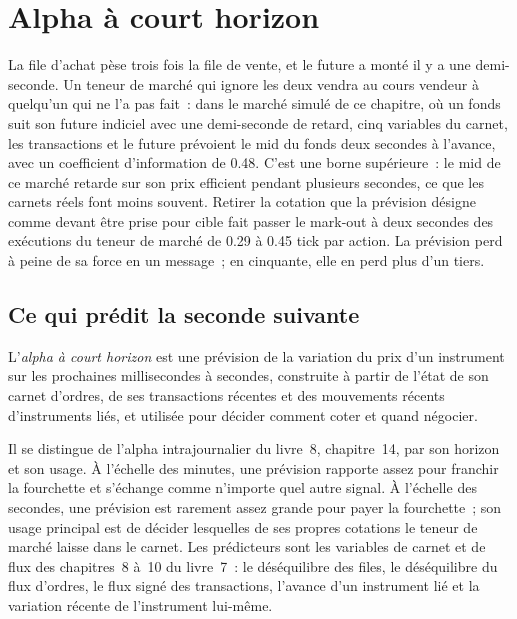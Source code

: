 \chapter{Alpha à court horizon}\label{ch:hf:short-horizon-alpha}

La file d'achat pèse trois fois la file de vente, et le future a monté il y a une demi-seconde. Un teneur de marché qui ignore les deux vendra au cours vendeur
à quelqu'un qui ne l'a pas fait~: dans le marché simulé de ce chapitre, où un fonds suit son future indiciel avec une demi-seconde de retard, cinq variables du carnet, les
transactions et le future prévoient le mid du fonds deux secondes à l'avance, avec un coefficient d'information de 0.48. C'est une borne supérieure~: le mid de ce
marché retarde sur son prix efficient pendant plusieurs secondes, ce que les carnets réels font moins souvent. Retirer la cotation que la prévision désigne
comme devant être prise pour cible fait passer le mark-out à deux secondes des exécutions du teneur de marché de 0.29 à 0.45 tick par action. La prévision perd à peine
de sa force en un message~; en cinquante, elle en perd plus d'un tiers.

\section{Ce qui prédit la seconde suivante}

\begin{definition}\label{def:hf:short-horizon-alpha:alpha}
L'\emph{alpha à court horizon} est une prévision de la variation du prix d'un instrument sur les prochaines millisecondes à secondes, construite
à partir de l'état de son carnet d'ordres, de ses transactions récentes et des mouvements récents d'instruments liés, et utilisée pour décider comment coter et quand négocier.
\end{definition}

Il se distingue de l'alpha intrajournalier du livre~8, chapitre~14, par son horizon et son usage. À l'échelle des minutes, une prévision rapporte assez pour franchir la fourchette
et s'échange comme n'importe quel autre signal. À l'échelle des secondes, une prévision est rarement assez grande pour payer la fourchette~; son usage principal est
de décider lesquelles de ses propres cotations le teneur de marché laisse dans le carnet. Les prédicteurs sont les variables de carnet et de flux des chapitres~8 à~10 du livre~7~: le déséquilibre des files,
le déséquilibre du flux d'ordres, le flux signé des transactions, l'avance d'un instrument lié et la variation récente de l'instrument lui-même.

